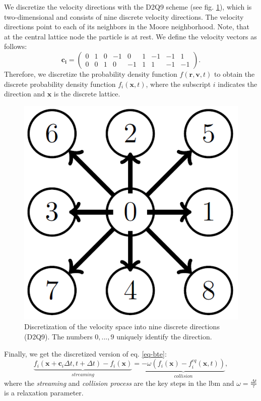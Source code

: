 \documentclass[a4paper,11pt, footsepline]{book}
\begin{document}
We discretize the velocity directions with the D2Q9 scheme (see fig. \ref{fig:mesh}), which is two-dimensional and consists of nine discrete velocity directions. The velocity directions point to each of its neighbors in the Moore neighborhood. Note, that at the central lattice node the particle is at rest. We define the velocity vectors as follows:
\begin{equation}
\mathbf{c_i}=\begin{pmatrix}
0 & 1 & 0 & -1 & 0 & 1 & -1 & -1 & 1\\
0 & 0 & 1 & 0 & -1 & 1 & 1 & -1 & -1
\end{pmatrix}.
\end{equation}
Therefore, we discretize the probability density function $f(\mathbf{r},\mathbf{v},t)$ to obtain the discrete probability density function $f_{i}(\mathbf{x},t)$, where the subscript $i$ indicates the direction and $\mathbf{x}$ is the discrete lattice.
\begin{figure}
  \begin{center}
   \includegraphics[width=.3\textwidth]{../figures/lbm/d2q9.png}
   \caption{Discretization of the velocity space into nine discrete directions (D2Q9). The numbers $0,...,9$ uniquely identify the direction.}
  \label{fig:mesh}
  \end{center}
\end{figure}

Finally, we get the discretized version of eq. \ref{eq-bte}:
\begin{equation}
\label{eq-discretizedBTE}
\underbrace{f_{i}(\mathbf{x}+\mathbf{c}_{i}\Delta t, t+\Delta t) - f_{i}(\mathbf{x})}_{streaming}
=\underbrace{-\omega(f_{i}(\mathbf{x})-f_{i}^{eq}(\mathbf{x},t))}_{collision},
\end{equation}
where the \textit{streaming} and \textit{collision process} are the key steps in the \ac{lbm} and $\omega=\frac{\Delta t}{\tau}$ is a relaxation parameter.
\end{document}
